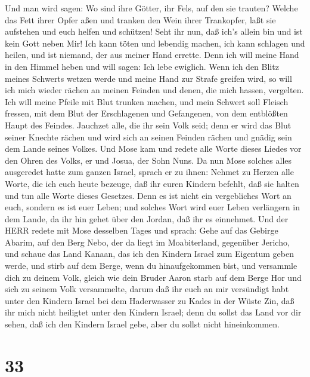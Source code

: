  Und man wird sagen: Wo sind ihre Götter, ihr Fels, auf den
sie trauten?  Welche das Fett ihrer Opfer aßen und tranken
den Wein ihrer Trankopfer, laßt sie aufstehen und euch helfen und
schützen!  Seht ihr nun, daß ich's allein bin und ist kein
Gott neben Mir! Ich kann töten und lebendig machen, ich kann schlagen
und heilen, und ist niemand, der aus meiner Hand errette. 
Denn ich will meine Hand in den Himmel heben und will sagen: Ich lebe
ewiglich.  Wenn ich den Blitz meines Schwerts wetzen werde
und meine Hand zur Strafe greifen wird, so will ich mich wieder rächen
an meinen Feinden und denen, die mich hassen, vergelten. 
Ich will meine Pfeile mit Blut trunken machen, und mein Schwert soll
Fleisch fressen, mit dem Blut der Erschlagenen und Gefangenen, von dem
entblößten Haupt des Feindes.  Jauchzet alle, die ihr sein
Volk seid; denn er wird das Blut seiner Knechte rächen und wird sich an
seinen Feinden rächen und gnädig sein dem Lande seines Volkes.
 Und Mose kam und redete alle Worte dieses Liedes vor den
Ohren des Volks, er und Josua, der Sohn Nuns.  Da nun Mose
solches alles ausgeredet hatte zum ganzen Israel,  sprach
er zu ihnen: Nehmet zu Herzen alle Worte, die ich euch heute bezeuge,
daß ihr euren Kindern befehlt, daß sie halten und tun alle Worte dieses
Gesetzes.  Denn es ist nicht ein vergebliches Wort an euch,
sondern es ist euer Leben; und solches Wort wird euer Leben verlängern
in dem Lande, da ihr hin gehet über den Jordan, daß ihr es einnehmet.
 Und der HERR redete mit Mose desselben Tages und sprach:
 Gehe auf das Gebirge Abarim, auf den Berg Nebo, der da
liegt im Moabiterland, gegenüber Jericho, und schaue das Land Kanaan,
das ich den Kindern Israel zum Eigentum geben werde,  und
stirb auf dem Berge, wenn du hinaufgekommen bist, und versammle dich zu
deinem Volk, gleich wie dein Bruder Aaron starb auf dem Berge Hor und
sich zu seinem Volk versammelte,  darum daß ihr euch an mir
versündigt habt unter den Kindern Israel bei dem Haderwasser zu Kades in
der Wüste Zin, daß ihr mich nicht heiligtet unter den Kindern Israel;
 denn du sollst das Land vor dir sehen, daß ich den Kindern
Israel gebe, aber du sollst nicht hineinkommen.

\hypertarget{section-32}{%
\section{33}\label{section-32}}

